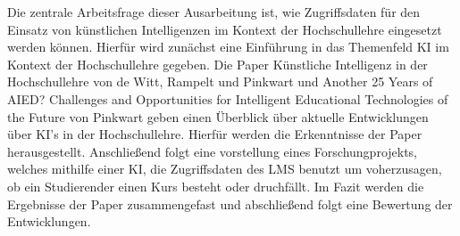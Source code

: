 Die zentrale Arbeitsfrage dieser Ausarbeitung ist, wie Zugriffsdaten für den Einsatz von künstlichen Intelligenzen im Kontext der Hochschullehre eingesetzt werden können.
\noindent
Hierfür wird zunächst eine Einführung in das Themenfeld KI im Kontext der Hochschullehre gegeben.
Die Paper \glqq Künstliche Intelligenz in der Hochschullehre\grqq{} von de Witt, Rampelt und Pinkwart und \glqq Another 25 Years of AIED? Challenges and Opportunities for Intelligent Educational Technologies of the Future\grqq{} von Pinkwart geben einen Überblick über aktuelle Entwicklungen über KI's in der Hochschullehre.
Hierfür werden die Erkenntnisse der Paper herausgestellt.
Anschließend folgt eine vorstellung eines Forschungprojekts, welches mithilfe einer KI, die Zugriffsdaten des \ac{LMS} benutzt um voherzusagen, ob ein Studierender einen Kurs besteht oder druchfällt. 
Im Fazit werden die Ergebnisse der Paper zusammengefast und abschließend folgt eine Bewertung der Entwicklungen.